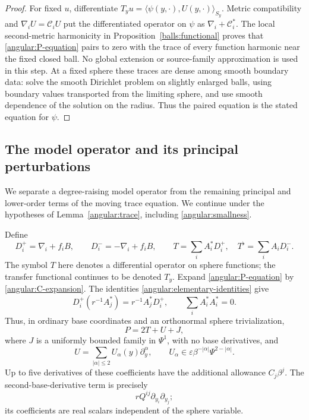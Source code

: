 \documentclass[11pt]{article}
\theoremstyle{definition}
\theoremstyle{remark}
\newcommand{\eps}{\varepsilon}
\numberwithin{equation}{section}
\begin{document}
\begin{proof}
For fixed $u$, differentiate
$T_yu=\langle\psi(y,\cdot),U(y,\cdot)\rangle_{S_y}$.
Metric compatibility and $\nabla_iU=\mathcal C_iU$ put the differentiated
operator on $\psi$ as $\nabla_i+\mathcal C_i^*$.
The local second-metric harmonicity in
Proposition~\ref{balls:functional} proves that
\eqref{angular:P-equation} pairs to zero with the trace of every
function harmonic near the fixed closed ball.  No global extension
or source-family approximation is used in this step.
At a fixed sphere these traces are dense among
smooth boundary data: solve the smooth Dirichlet problem on slightly
enlarged balls, using boundary values transported from the limiting sphere,
and use smooth dependence of the solution on the radius.  Thus the paired
equation is the stated equation for $\psi$.
\end{proof}

\subsection{The model operator and its principal perturbations}

We separate a degree-raising model operator from the remaining
principal and lower-order terms of the moving trace equation.  We continue under the hypotheses of
Lemma~\ref{angular:trace}, including \eqref{angular:smallness}.

Define
\begin{equation}\label{angular:T-definition}
 D_i^+=\nabla_i+f_iB,\qquad D_i^-=-\nabla_i+f_iB,
 \qquad
 T=\sum_i A_i^*D_i^+,\quad T^\flat=\sum_i A_iD_i^-.
\end{equation}
The symbol $T$ here denotes a differential operator on sphere functions;
the transfer functional continues to be denoted $T_y$.
Expand \eqref{angular:P-equation} by
\eqref{angular:C-expansion}.  The identities
\eqref{angular:elementary-identities} give
\[
 D_i^+(r^{-1}A_j^*)=r^{-1}A_j^*D_i^+,
 \qquad \sum_iA_i^*A_i^*=0.
\]
Thus, in ordinary base coordinates and an orthonormal sphere
trivialization,
\begin{equation}\label{angular:P-decomposition}
 P=2T+U+J,
\end{equation}
where $J$ is a uniformly bounded family in $\Psi^1$, with no base
derivatives, and
\begin{equation}\label{angular:U-bounds}
 U=\sum_{|\alpha|\le2}U_\alpha(y)\partial_y^\alpha,
 \qquad U_\alpha\in\eps\beta^{-|\alpha|}
                               \Psi^{2-|\alpha|}.
\end{equation}
Up to five derivatives of these coefficients have the additional
allowance $C_j\beta^j$.  The second-base-derivative term is precisely
\begin{equation}\label{angular:real-principal-part}
 rQ^{ij}\partial_{y_i}\partial_{y_j};
\end{equation}
its coefficients are real scalars independent of the sphere variable.
\end{document}
